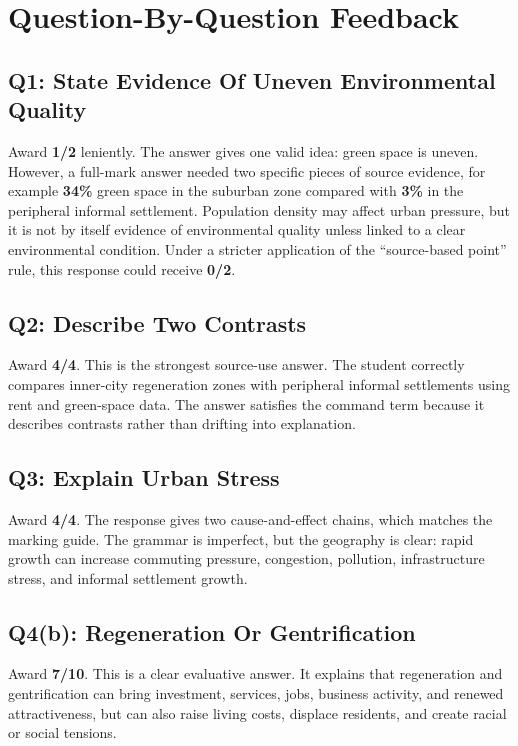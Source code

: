 \documentclass[11pt,a4paper]{article}
\newcommand{\term}[1]{\textcolor{HeadingBlue}{\textbf{#1}}}
\newcommand{\score}[1]{\textcolor{AccentTeal}{\textbf{#1}}}
\begin{document}
\section{Question-By-Question Feedback}

\subsection{Q1: State Evidence Of Uneven Environmental Quality}

Award \score{1/2} leniently. The answer gives one valid idea: green space is uneven.
However, a full-mark answer needed two specific pieces of source evidence, for
example \term{34\%} green space in the suburban zone compared with \term{3\%}
in the peripheral informal settlement. Population density may affect urban
pressure, but it is not by itself evidence of environmental quality unless
linked to a clear environmental condition. Under a stricter application of the
``source-based point'' rule, this response could receive \score{0/2}.

\subsection{Q2: Describe Two Contrasts}

Award \score{4/4}. This is the strongest source-use answer. The student
correctly compares inner-city regeneration zones with peripheral informal
settlements using rent and green-space data. The answer satisfies the command
term because it describes contrasts rather than drifting into explanation.

\subsection{Q3: Explain Urban Stress}

Award \score{4/4}. The response gives two cause-and-effect chains, which matches
the marking guide. The grammar is imperfect, but the geography is clear: rapid
growth can increase commuting pressure, congestion, pollution, infrastructure
stress, and informal settlement growth.

\subsection{Q4(b): Regeneration Or Gentrification}

Award \score{7/10}. This is a clear evaluative answer. It explains that
regeneration and gentrification can bring investment, services, jobs, business
activity, and renewed attractiveness, but can also raise living costs, displace
residents, and create racial or social tensions.
\end{document}
